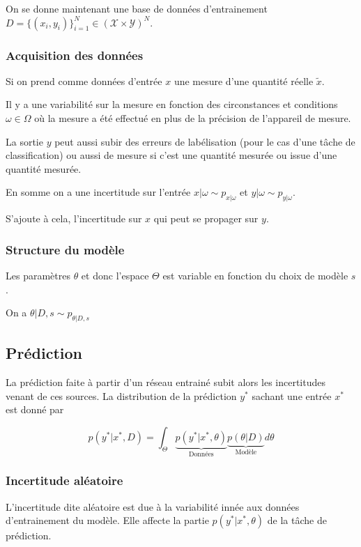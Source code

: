 \documentclass[french,12pt]{article}
\begin{document}
On se donne maintenant une base de données d'entrainement
$D = \{ (x_i, y_i)\}_{i = 1}^N \in (\mathcal{X} \times \mathcal{Y})^N$.

\subsubsection{Acquisition des données}

Si on prend comme données d'entrée $x$ une mesure d'une quantité réelle $\tilde{x}$.

Il y a une variabilité sur la mesure en fonction des circonstances
et conditions $\omega \in \Omega$ où la mesure a été effectué en 
plus de la précision de l'appareil de mesure.

La sortie $y$ peut aussi subir des erreurs de labélisation
(pour le cas d'une tâche de classification) ou aussi de mesure si c'est 
une quantité mesurée ou issue d'une quantité mesurée.

En somme on a une incertitude sur l'entrée $x | \omega \sim p_{x | \omega}$
et $y | \omega \sim p_{y | \omega}$.

S'ajoute à cela, l'incertitude sur $x$ qui peut se propager sur $y$.

\subsubsection{Structure du modèle}

Les paramètres $\theta$ et donc l'espace $\Theta$ est variable en fonction du choix de modèle $s$.

On a $\theta | D,s \sim p_{\theta | D, s}$

\subsection{Prédiction}

La prédiction faite à partir d'un réseau entrainé subit alors les incertitudes venant
de ces sources. La distribution de la prédiction $y^*$ sachant une entrée $x^*$ est donné par

$$ p(y^* | x^*, D) = \int_{\Theta} \underbrace{p(y^* | x^*, \theta)}_{\text{Données}} \underbrace{p(\theta  | D)}_{\text{Modèle}} d \theta$$

\subsubsection{Incertitude aléatoire}

L'incertitude dite aléatoire est due à la variabilité innée aux données d'entrainement
du modèle. Elle affecte la partie $p(y^* | x^*, \theta)$ de la tâche de prédiction.
\end{document}
